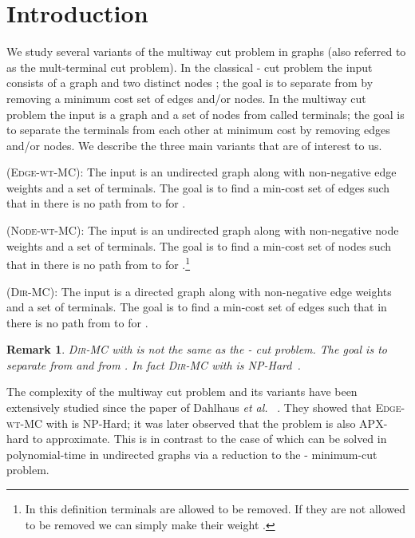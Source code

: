 \documentclass[11pt]{article}
\newtheorem{remark}[lemma]{Remark}
\newcommand{\etal}{{\em et al.}~}
\def\MC{\textsc{Edge-wt-MC}\xspace}
\def\DirMC{\textsc{Dir-MC}\xspace}
\def\NodeMC{\textsc{Node-wt-MC}\xspace}
\def\NodeMC{\textsc{Node-wt-MC}\xspace}
\begin{document}
\newpage
\section{Introduction}
We study several variants of the multiway cut problem in graphs (also
referred to as the mult-terminal cut problem). In the classical
- cut problem the input consists of a graph  and two
distinct nodes ; the goal is to separate  from  by removing
a minimum cost set of edges and/or nodes. In the multiway cut problem
the input is a graph  and a set 
of  nodes from  called terminals; the goal is to separate the terminals
from each other at minimum cost by removing edges and/or nodes. We
describe the three main variants that are of interest to us.

\medskip 
{} (\MC): The input is an undirected
graph  along with non-negative edge weights 
and a set  of terminals. The goal
is to find a min-cost set of edges  such that in  there is no path from  to  for .

\medskip 
{} (\NodeMC): The input is an
undirected graph  along with non-negative node weights  and a set  of terminals. The
goal is to find a min-cost set of nodes  such that
in  there is no path from  to  for .\footnote{
In this definition terminals are allowed to be removed. If they are not allowed
to be removed we can simply make their weight .}



\medskip 
{} (\DirMC): The input is a
directed graph  along with non-negative edge weights  and a set  of terminals. The
goal is to find a min-cost set of edges  such that
in  there is no path from  to  for .

\begin{remark}
  \DirMC with  is \emph{not} the same as the - cut problem.
  The goal is to separate  from  \emph{and}  from .
  In fact \DirMC with  is NP-Hard~\cite{GargVY94}. 
\end{remark}

The complexity of the multiway cut problem and its variants have been
extensively studied since the paper of Dahlhaus \etal
\cite{DahlhausJPSY92}. They showed that \MC with  is NP-Hard; it
was later observed that the problem is also APX-hard to approximate. This
is in contrast to the case of  which can be solved in 
polynomial-time in undirected graphs via a reduction to the
- minimum-cut problem.
\end{document}
